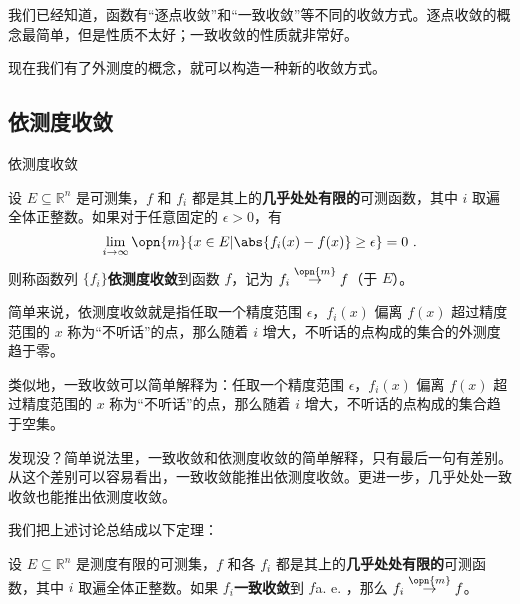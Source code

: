

我们已经知道，函数有“逐点收敛”和“一致收敛”等不同的收敛方式。逐点收敛的概念最简单，但是性质不太好；一致收敛的性质就非常好。

现在我们有了外测度的概念，就可以构造一种新的收敛方式。

\subsection{依测度收敛}

\begin{definition}{依测度收敛}

设 $E\subseteq \mathbb{R}^n$ 是可测集，$f$ 和 $f_i$ 都是其上的\textbf{几乎处处有限的}可测函数，其中 $i$ 取遍全体正整数。如果对于任意固定的 $\epsilon>0$，有
\begin{equation}
\lim\limits_{i\to\infty}\opn{m}\{x\in E|\abs{f_i(x)-f(x)}\geq\epsilon\}=0~.
\end{equation}
则称函数列 $\{f_i\}$\textbf{依测度收敛}到函数 $f$，记为 $f_i\overset{\opn{m}}\to f$（于 $E$）。

\end{definition}

简单来说，依测度收敛就是指任取一个精度范围 $\epsilon$，$f_i(x)$ 偏离 $f(x)$ 超过精度范围的 $x$ 称为“不听话”的点，那么随着 $i$ 增大，不听话的点构成的集合的外测度趋于零。

类似地，一致收敛可以简单解释为：任取一个精度范围 $\epsilon$，$f_i(x)$ 偏离 $f(x)$ 超过精度范围的 $x$ 称为“不听话”的点，那么随着 $i$ 增大，不听话的点构成的集合趋于空集。

发现没？简单说法里，一致收敛和依测度收敛的简单解释，只有最后一句有差别。从这个差别可以容易看出，一致收敛能推出依测度收敛。更进一步，几乎处处一致收敛也能推出依测度收敛。

我们把上述讨论总结成以下定理：



\begin{theorem}{}\label{the_LimMs_2}

设 $E\subseteq \mathbb{R}^n$ 是测度有限的可测集，$f$ 和各 $f_i$ 都是其上的\textbf{几乎处处有限的}可测函数，其中 $i$ 取遍全体正整数。如果 $f_i$\textbf{一致收敛}到 $f$a. e.  ，那么 $f_i\overset{\opn{m}}\to f$。

\end{theorem}



